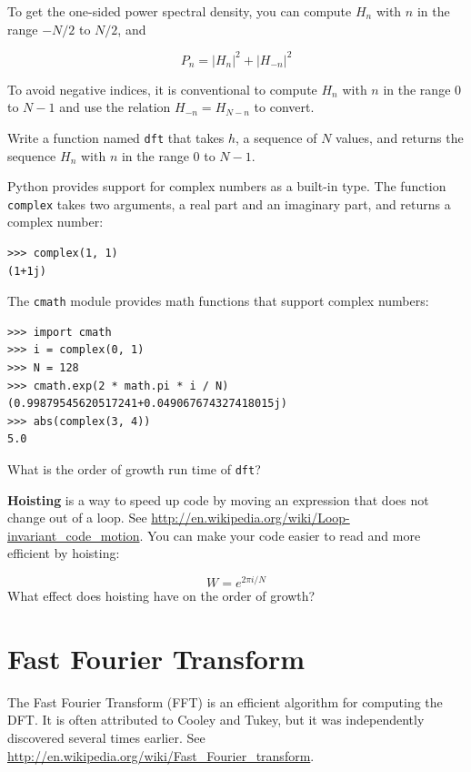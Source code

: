 \documentclass[10pt]{book}
\begin{document}
To get the one-sided power spectral density, you can compute $H_n$
with $n$ in the range $-N/2$ to $N/2$, and

\[ P_n = |H_n|^2 + |H_{-n}|^2 \]

To avoid negative indices, it is conventional to compute
$H_n$ with $n$ in the range $0$ to $N-1$ and use the relation
$H_{-n} = H_{N-n}$ to convert.

\begin{exercise}

Write a function named {\tt dft} that takes $h$, a sequence of $N$
values, and returns the sequence $H_n$ with $n$ in the range $0$ to
$N-1$.

Python provides support for complex numbers as a built-in type.
The function {\tt complex} takes two arguments, a real part
and an imaginary part, and returns a complex number:

\begin{verbatim}
>>> complex(1, 1)
(1+1j)
\end{verbatim}

The {\tt cmath} module provides math functions that support
complex numbers:

\begin{verbatim}
>>> import cmath
>>> i = complex(0, 1)
>>> N = 128
>>> cmath.exp(2 * math.pi * i / N)
(0.99879545620517241+0.049067674327418015j)
>>> abs(complex(3, 4))
5.0
\end{verbatim}

What is the order of growth run time of {\tt dft}?

{\bf Hoisting} is a way to speed up code by moving an
expression that does not change out of a loop.
See \url{http://en.wikipedia.org/wiki/Loop-invariant_code_motion}.
You can make your code easier to read and more efficient
by hoisting:

\begin{equation}
W = e^{2 \pi i / N}
\end{equation}
%
What effect does hoisting have on the order of growth?

\end{exercise}


\section{Fast Fourier Transform}

The Fast Fourier Transform (FFT) is an efficient algorithm for
computing the DFT.  It is often attributed to Cooley and Tukey,
but it was independently discovered several times earlier.
See \url{http://en.wikipedia.org/wiki/Fast_Fourier_transform}.
\end{document}
